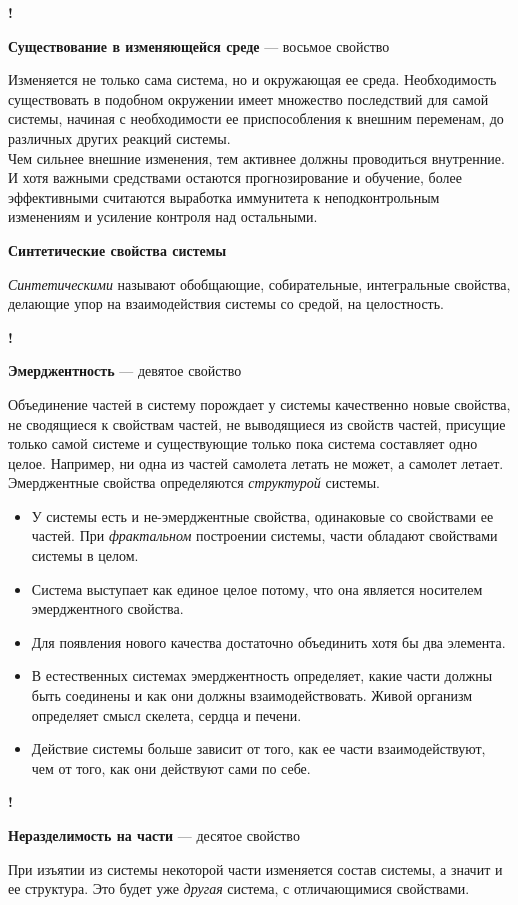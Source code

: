 \documentclass{article}
\newcommand{\note}[1]{\textit{#1}}
\renewcommand{\subsection}[1]{
	\vspace{2em}
	\begin{flushright}
		\large
		\textbf{#1}
	\end{flushright}
	}
\newcommand{\define}[2]{
	\textbf{#1} --- #2
	}
\newcommand{\marked}[2]{
	\begin{flushright}\textbf{!}\hspace{2ex}\vline\hspace{2ex}
		\begin{minipage}{0.9\textwidth}
			\define{#1}{#2}
		\end{minipage}
	\end{flushright}
	}
\begin{document}
\marked{Существование в изменяющейся среде}{восьмое свойство}
Изменяется не только сама система, но и окружающая ее среда. Необходимость существовать в подобном окружении имеет множество последствий для самой системы, начиная с необходимости ее приспособления к внешним переменам, до различных других реакций системы.\\
Чем сильнее внешние изменения, тем активнее должны проводиться внутренние. И хотя важными средствами остаются прогнозирование и обучение, более эффективными считаются выработка иммунитета к неподконтрольным изменениям и усиление контроля над остальными.
\subsection{Синтетические свойства системы}
\note{Синтетическими} называют обобщающие, собирательные, интегральные свойства, делающие упор на взаимодействия системы со средой, на целостность.
\marked{Эмерджентность}{девятое свойство}
Объединение частей в систему порождает у системы качественно новые свойства, не сводящиеся к свойствам частей, не выводящиеся из свойств частей, присущие только самой системе и существующие только пока система составляет одно целое. Например, ни одна из частей самолета летать не может, а самолет летает. Эмерджентные свойства определяются \note{структурой} системы.\\
\begin{itemize}
	\item У системы есть и не-эмерджентные свойства, одинаковые со свойствами ее частей. При \note{фрактальном} построении системы, части обладают свойствами системы в целом.
	\item Система выступает как единое целое потому, что она является носителем эмерджентного свойства.
	\item Для появления нового качества достаточно объединить хотя бы два элемента.
	\item В естественных системах эмерджентность определяет, какие части должны быть соединены и как они должны взаимодействовать. Живой организм определяет смысл скелета, сердца и печени.
	\item Действие системы больше зависит от того, как ее части взаимодействуют, чем от того, как они действуют сами по себе.
\end{itemize}
\marked{Неразделимость на части}{десятое свойство}
При изъятии из системы некоторой части изменяется состав системы, а значит и ее структура. Это будет уже \note{другая} система, с отличающимися свойствами.\\
\end{document}
